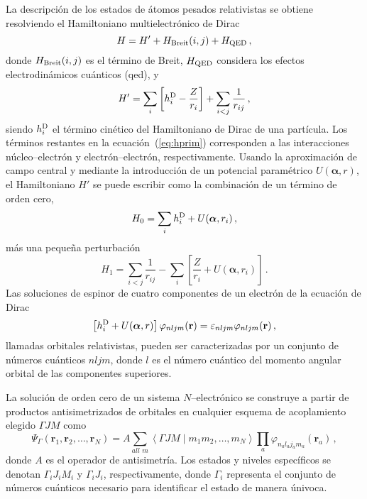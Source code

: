 La descripción de los estados de átomos pesados relativistas se 
obtiene resolviendo el Hamiltoniano multielectrónico de Dirac 
\begin{equation}
 H = H' + H_{\mathrm{\mbox{\scriptsize Breit}}}(i,j) +
 H_{\mbox{\scriptsize QED}}\,,
\label{eq:htot}
\end{equation}
donde $H_{\mathrm{\mbox{\scriptsize Breit}}}(i,j)$ es el término de 
Breit, $H_{\mbox{\scriptsize QED}}$ considera los efectos 
electrodinámicos cuánticos (\acs{qed}), y
\begin{equation}
 H' = \sum_i \left[ h_i^{\mbox{\scriptsize D}} - \frac{Z}{r_i}\right]
 + \sum_{i<j}\frac{1}{r_{ij}}\,,
\label{eq:HDirac}
\end{equation}
siendo $h_i^{\mbox{\scriptsize D}}$ el término cinético del 
Hamiltoniano de Dirac de una partícula. Los términos restantes en la
ecuación~(\ref{eq:hprim}) corresponden a las interacciones 
núcleo--electrón y electrón--electrón, respectivamente. Usando la 
aproximación de campo central y mediante la introducción de un potencial 
paramétrico $U(\boldsymbol{\alpha},r)$, el Hamiltoniano $H'$ se puede escribir como la 
combinación de un término de orden cero, 
\begin{equation}
 H_0 = \sum_i h_i^{\mbox{\scriptsize D}} + U(\boldsymbol{\alpha},r_i)\,,
\end{equation}
más una pequeña perturbación
\begin{equation}
 H_1 = \sum_{i<j}\frac{1}{r_{ij}}
 - \sum_i \left[ \frac{Z}{r_i} + U(\boldsymbol{\alpha},r_i) \right]\,.
\end{equation}
Las soluciones de espinor de cuatro componentes de un electrón de la 
ecuación de Dirac
\begin{equation}
\left[ h_i^{\mbox{\scriptsize D}} +U(\boldsymbol{\alpha},r) \right] \varphi_{nljm}(\mathbf{r}) 
= \varepsilon_{nljm} \varphi_{nljm}(\mathbf{r})\,,
\label{eq:ecuacionDirac}
\end{equation}
llamadas orbitales relativistas, pueden ser caracterizadas por un 
conjunto de números cuánticos $nljm$, donde $l$ es el número cuántico 
del momento angular orbital de las componentes superiores. 

La solución de orden cero de un sistema $N$--electrónico se construye a 
partir de productos antisimetrizados de orbitales en cualquier esquema 
de acoplamiento elegido $\Gamma JM$ como 
\begin{equation}
\Psi_{\Gamma}\left(\mathbf{r}_1, \mathbf{r}_2, \ldots, \mathbf{r}_N\right)=A \sum_{all\,\,m}\left\langle\Gamma J M \mid m_1 m_2, \ldots, m_{N}\right\rangle \prod_{a} \varphi_{n_a l_a j_a m_a}\left(\mathbf{r}_a\right)\,,
\end{equation}
donde $A$ es el operador de antisimetría. Los estados y niveles 
específicos se denotan $\Gamma_iJ_iM_i$ y $\Gamma_iJ_i$, respectivamente,
donde $\Gamma_i$ representa el conjunto de números cuánticos necesario 
para identificar el estado de manera únivoca. 

